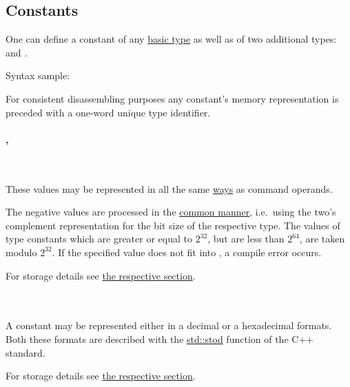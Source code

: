 \hypertarget{constants}{
	\subsection{Constants}
}

One can define a constant of any \hyperlink{types:basic}{basic type} 
as well as of two additional types:  and .

Syntax sample: 

For consistent disassembling purposes any constant's memory representation 
is preceded with a one-word unique type identifier.

\vspace{-0.35cm}

\paragraph{, }\

These values may be represented in all the same 
\hyperlink{operand:representation}{ways} as command operands.

The negative values are processed in the \hyperlink{types:twos_complement}
{common manner}, i.e.\ using the two's complement representation for
the bit size of the respective type.
The values of  type constants which are greater or equal
to $2^{32}$, but are less than $2^{64}$, are taken modulo $2^{32}$.
If the specified value does not fit into , a compile error occurs.

For storage details see
\hyperlink{types:two_words_storage}{the respective section}.

\vspace{-0.35cm}

\paragraph{}\

A  constant may be represented either in a decimal or
a hexadecimal formats.
Both these formats are described with the 
\href{https://en.cppreference.com/w/cpp/string/basic_string/stof}{std::stod}
function of the C++ standard.

For storage details see
\hyperlink{types:two_words_storage}{the respective section}.

\vspace{-0.35cm}

\paragraph{}\

